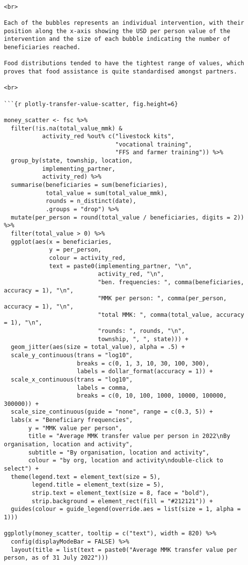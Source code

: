 \documentclass[
]{article}
\begin{document}
\begin{verbatim}

<br>

Each of the bubbles represents an individual intervention, with their position along the x-axis showing the USD per person value of the intervention and the size of each bubble indicating the number of beneficiaries reached.

Food distributions tended to have the tightest range of values, which proves that food assistance is quite standardised amongst partners. 

<br>

```{r plotly-transfer-value-scatter, fig.height=6}

money_scatter <- fsc %>% 
  filter(!is.na(total_value_mmk) & 
           activity_red %out% c("livestock kits",
                                "vocational training",
                                "FFS and farmer training")) %>%
  group_by(state, township, location, 
           implementing_partner, 
           activity_red) %>% 
  summarise(beneficiaries = sum(beneficiaries), 
            total_value = sum(total_value_mmk), 
            rounds = n_distinct(date), 
            .groups = "drop") %>% 
  mutate(per_person = round(total_value / beneficiaries, digits = 2)) %>% 
  filter(total_value > 0) %>%
  ggplot(aes(x = beneficiaries, 
             y = per_person, 
             colour = activity_red, 
             text = paste0(implementing_partner, "\n", 
                           activity_red, "\n", 
                           "ben. frequencies: ", comma(beneficiaries, accuracy = 1), "\n",
                           "MMK per person: ", comma(per_person, accuracy = 1), "\n", 
                           "total MMK: ", comma(total_value, accuracy = 1), "\n", 
                           "rounds: ", rounds, "\n", 
                           township, ", ", state))) + 
  geom_jitter(aes(size = total_value), alpha = .5) + 
  scale_y_continuous(trans = "log10", 
                     breaks = c(0, 1, 3, 10, 30, 100, 300),
                     labels = dollar_format(accuracy = 1)) + 
  scale_x_continuous(trans = "log10", 
                     labels = comma, 
                     breaks = c(0, 10, 100, 1000, 10000, 100000, 300000)) + 
  scale_size_continuous(guide = "none", range = c(0.3, 5)) + 
  labs(x = "Beneficiary frequencies", 
       y = "MMK value per person", 
       title = "Average MMK transfer value per person in 2022\nBy organisation, location and activity", 
       subtitle = "By organisation, location and activity", 
       colour = "by org, location and activity\ndouble-click to select") + 
  theme(legend.text = element_text(size = 5),
        legend.title = element_text(size = 5),
        strip.text = element_text(size = 8, face = "bold"),
        strip.background = element_rect(fill = "#212121")) + 
  guides(colour = guide_legend(override.aes = list(size = 1, alpha = 1))) 

ggplotly(money_scatter, tooltip = c("text"), width = 820) %>% 
  config(displayModeBar = FALSE) %>%
  layout(title = list(text = paste0("Average MMK transfer value per person, as of 31 July 2022")))

\end{verbatim}
\end{document}
